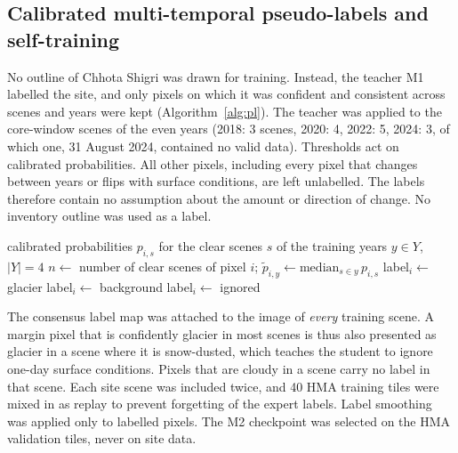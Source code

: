 \documentclass[pdflatex,sn-mathphys-num]{sn-jnl}%
\theoremstyle{thmstyleone}%
\theoremstyle{thmstyletwo}%
\theoremstyle{thmstylethree}%
\begin{document}
\subsection{Calibrated multi-temporal pseudo-labels and self-training}\label{subsec3.6}

No outline of Chhota Shigri was drawn for training. Instead, the teacher M1 labelled the site, and only pixels on which it was confident and consistent across scenes and years were kept (Algorithm~\ref{alg:pl}). The teacher was applied to the core-window scenes of the even years (2018: 3 scenes, 2020: 4, 2022: 5, 2024: 3, of which one, 31 August 2024, contained no valid data). Thresholds act on calibrated probabilities. All other pixels, including every pixel that changes between years or flips with surface conditions, are left unlabelled. The labels therefore contain no assumption about the amount or direction of change. No inventory outline was used as a label.

\begin{algorithm}
\caption{Consensus pseudo-label for pixel $i$ (thresholds $\tau_g = 0.95$, $\tau_b = 0.05$, $f = 0.6$, $k = 3$)}\label{alg:pl}
\begin{algorithmic}[1]
\Require calibrated probabilities $p_{i,s}$ for the clear scenes $s$ of the training years $y \in Y$, $|Y| = 4$
\State $n \gets$ number of clear scenes of pixel $i$; $\tilde{p}_{i,y} \gets \mathrm{median}_{s \in y}\, p_{i,s}$
  \State label$_i \gets$ glacier
  \State label$_i \gets$ background
\Else
  \State label$_i \gets$ ignored 
\EndIf
\end{algorithmic}
\end{algorithm}

The consensus label map was attached to the image of \emph{every} training scene. A margin pixel that is confidently glacier in most scenes is thus also presented as glacier in a scene where it is snow-dusted, which teaches the student to ignore one-day surface conditions. Pixels that are cloudy in a scene carry no label in that scene. Each site scene was included twice, and 40 HMA training tiles were mixed in as replay to prevent forgetting of the expert labels. Label smoothing was applied only to labelled pixels. The M2 checkpoint was selected on the HMA validation tiles, never on site data.
\end{document}
